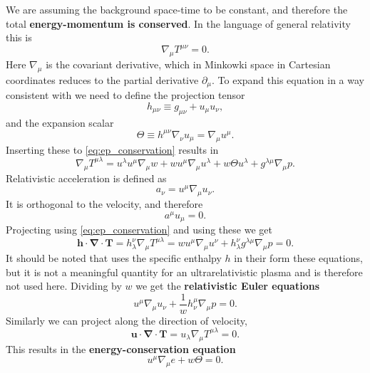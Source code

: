 We are assuming the background space-time to be constant, and therefore the total \textbf{energy-momentum is conserved}.
In the language of general relativity this is
\begin{equation}
\nabla_\mu T^{\mu\nu} = 0.
\label{eq:ep_conservation}
\end{equation}
Here $\nabla_\mu$ is the covariant derivative, which in Minkowki space in Cartesian coordinates reduces to the partial derivative $\partial_\mu$.
To expand this equation in a way consistent with \cite[ch. 3.3]{rezzolla_relativistic_2013} we need to define the projection tensor
\cite[eq. 3.9]{rezzolla_relativistic_2013}
\begin{equation}
h_{\mu\nu} \equiv g_{\mu\nu} + u_\mu u_\nu,
\label{eq:projection_tensor}
\end{equation}
and the expansion scalar
\cite[eq. 3.13]{rezzolla_relativistic_2013}
\begin{equation}
\Theta \equiv h^{\mu\nu} \nabla_\nu u_\mu = \nabla_\mu u^\mu.
\end{equation}
Inserting these to \eqref{eq:ep_conservation} results in
\begin{equation}
\nabla_\mu T^{\mu \lambda} = u^\lambda u^\mu \nabla_\mu w + w u^\mu \nabla_\mu u^\lambda + w \Theta u^\lambda + g^{\lambda\mu} \nabla_\mu p.
\end{equation}
Relativistic acceleration is defined as
\begin{equation}
a_\nu = u^\mu \nabla_\mu u_\nu.
\end{equation}
It is orthogonal to the velocity, and therefore
\begin{equation}
a^\mu u_\mu = 0.
\end{equation}
Projecting using \eqref{eq:ep_conservation} and using these we get
\cite[eq. 3.54]{rezzolla_relativistic_2013}
\begin{equation}
\bm{h} \cdot \bm{\nabla} \cdot \bm{T}
= h^\nu_\lambda \nabla_\mu T^{\mu \lambda}
= w u^\mu \nabla_\mu u^\nu + h^\nu_\lambda g^{\lambda\mu} \nabla_\mu p
= 0.
\end{equation}
It should be noted that \cite{rezzolla_relativistic_2013} uses the specific enthalpy $h$ in their form these equations, but it is not a meaningful quantity for an ultrarelativistic plasma and is therefore not used here.
Dividing by $w$ we get the \textbf{relativistic Euler equations}
\cite[eq. 3.55]{rezzolla_relativistic_2013}
\begin{equation}
u^\mu \nabla_\mu u_\nu + \frac{1}{w} h^\mu_\nu \nabla_\mu p = 0.
\end{equation}
Similarly we can project along the direction of velocity,
\begin{equation}
\bm{u} \cdot \bm{\nabla} \cdot \bm{T} = u_\lambda \nabla_\mu T^{\mu\lambda} = 0.
\end{equation}
This results in the \textbf{energy-conservation equation}
\cite[eq. 3.57]{rezzolla_relativistic_2013}
\begin{equation}
u^\mu \nabla_\mu e + w \Theta = 0.
\end{equation}

